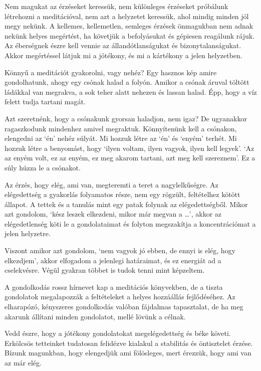 Nem magukat az érzéseket keressük, nem különleges érzéseket próbálunk
létrehozni a meditációval, nem azt a helyzetet keressük, ahol mindig
minden jól megy nekünk. A kellemes, kellemetlen, semleges érzések
önmagukban nem adnak nekünk helyes megértést, ha követjük a befolyásukat
és gépiesen reagálunk rájuk. Az éberségnek észre kell vennie az
állandótlanságukat és bizonytalanságukat. Akkor megértéssel látjuk mi a
jótékony, és mi a kártékony a jelen helyzetben.


Könnyű a meditációt gyakorolni, vagy nehéz? Egy hasznos kép amire
gondolhatunk, ahogy egy csónak halad a folyón. Amikor a csónak áruval
töltött ládákkal van megrakva, a sok teher alatt nehezen és lassan
halad. Épp, hogy a víz felett tudja tartani magát.

\enlargethispage*{\baselineskip}

Azt szeretnénk, hogy a csónakunk gyorsan haladjon, nem igaz? De
ugyanakkor ragaszkodunk mindenhez amivel megraktuk. Könnyítenünk kell a
csónakon, elengedni az `én' nehéz súlyát. Mi hozzuk létre az `én' és
`enyém' terhét. Mi hozzuk létre a benyomást, hogy `ilyen voltam, ilyen
vagyok, ilyen kell legyek'. `Az az enyém volt, ez az enyém, ez meg
akarom tartani, azt meg kell szereznem'. Ez a súly húzza le a csónakot.

Az érzés, hogy elég, ami van, megteremti a teret a nagylelkűségre. Az
elégedettség a gyakorlás folyamatos része, nem egy rögzült, feltételhez
kötött állapot. A tettek és a tanulás mint egy patak folynak az
elégedettségből. Mikor azt gondolom, `kész leszek elkezdeni, mikor már
megvan a \ldots{}', akkor az elégedetlenség köti le a gondolataimat és
folyton megszakítja a koncentrációmat a jelen helyzetre.


Viszont amikor azt gondolom, `nem vagyok jó ebben, de ennyi is elég,
hogy elkezdjem', akkor elfogadom a jelenlegi határaimat, és ez energiát
ad a cselekvésre. Végül gyakran többet is tudok tenni mint képzeltem.

A gondolkodás rossz hírnevet kap a meditációs könyvekben, de a tiszta
gondolatok megalapozzák a feltételeket a helyes hozzáállás fejlődéséhez.
Az elharapózó, kényszeres gondolkodás valóban fájdalmas tapasztalat, de
ha meg akarunk állítani minden gondolatot, mellé lövünk a célnak.

Vedd észre, hogy a jótékony gondolatokat megelégedettség és béke követi.
Erkölcsös tetteinket tudatosan felidézve kialakul a stabilitás és
öntisztelet érzése. Bízunk magunkban, hogy elengedjük ami fölösleges,
mert érezzük, hogy ami van az már elég.

